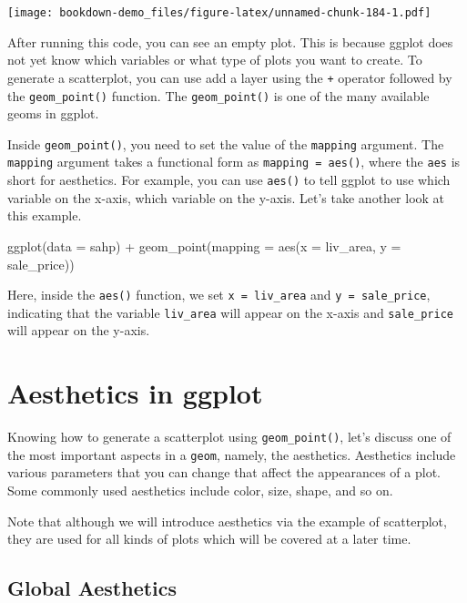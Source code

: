 \documentclass[
]{book}
\newenvironment{Shaded}{\begin{snugshade}}{\end{snugshade}}
\newcommand{\AttributeTok}[1]{\textcolor[rgb]{0.77,0.63,0.00}{#1}}
\newcommand{\FunctionTok}[1]{\textcolor[rgb]{0.00,0.00,0.00}{#1}}
\newcommand{\NormalTok}[1]{#1}
\newcommand{\SpecialCharTok}[1]{\textcolor[rgb]{0.00,0.00,0.00}{#1}}
\begin{document}
\texttt{[image: bookdown-demo\_files/figure-latex/unnamed-chunk-184-1.pdf]}

After running this code, you can see an empty plot. This is because ggplot does not yet know which variables or what type of plots you want to create. To generate a scatterplot, you can use add a layer using the \texttt{+} operator followed by the \texttt{geom\_point()} function. The \texttt{geom\_point()} is one of the many available geoms in ggplot.

Inside \texttt{geom\_point()}, you need to set the value of the \texttt{mapping} argument. The \texttt{mapping} argument takes a functional form as \texttt{mapping\ =\ aes()}, where the \texttt{aes} is short for aesthetics. For example, you can use \texttt{aes()} to tell ggplot to use which variable on the x-axis, which variable on the y-axis. Let's take another look at this example.

\begin{Shaded}
\begin{Highlighting}[]
\FunctionTok{ggplot}\NormalTok{(}\AttributeTok{data =}\NormalTok{ sahp) }\SpecialCharTok{+} \FunctionTok{geom\_point}\NormalTok{(}\AttributeTok{mapping =} \FunctionTok{aes}\NormalTok{(}\AttributeTok{x =}\NormalTok{ liv\_area, }\AttributeTok{y =}\NormalTok{ sale\_price))}
\end{Highlighting}
\end{Shaded}

Here, inside the \texttt{aes()} function, we set \texttt{x\ =\ liv\_area} and \texttt{y\ =\ sale\_price}, indicating that the variable \texttt{liv\_area} will appear on the x-axis and \texttt{sale\_price} will appear on the y-axis.

\hypertarget{aes}{%
\section{Aesthetics in ggplot}\label{aes}}

Knowing how to generate a scatterplot using \texttt{geom\_point()}, let's discuss one of the most important aspects in a \texttt{geom}, namely, the aesthetics. Aesthetics include various parameters that you can change that affect the appearances of a plot. Some commonly used aesthetics include color, size, shape, and so on.

Note that although we will introduce aesthetics via the example of scatterplot, they are used for all kinds of plots which will be covered at a later time.

\hypertarget{global-aes}{%
\subsection{Global Aesthetics}\label{global-aes}}
\end{document}
